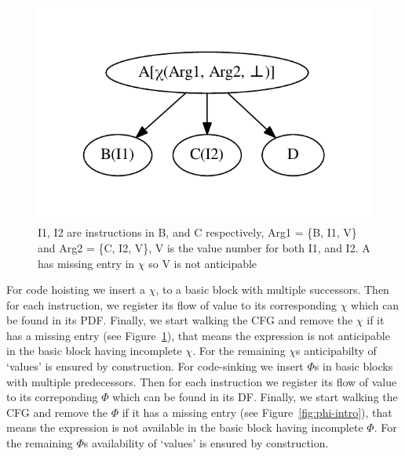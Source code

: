 \documentclass[sigplan,10pt,review,anonymous]{acmart}\settopmatter{printfolios=true,printccs=false,printacmref=false}
\begin{document}
\begin{figure}
  \includegraphics[scale=0.55]{chi-example2.pdf}
  \vspace*{-1.0cm}
\caption{I1, I2 are instructions in B, and C respectively, Arg1 = \{B, I1, V\}
  and Arg2 = \{C, I2, V\}, V is the value number for both I1, and I2. A has
  missing entry in $\chi$ so V is not anticipable}
\label{fig:chi-intro2}
\end{figure}

For code hoisting we insert a $\chi$, to a basic block with multiple
successors. Then for each instruction, we register its flow of value to its
corresponding $\chi$ which can be found in its PDF. Finally, we start walking
the CFG and remove the $\chi$ if it has a missing entry (see
Figure~\ref{fig:chi-intro2}), that means the expression is not anticipable in
the basic block having incomplete $\chi$. For the remaining $\chi$s
anticipabilty of `values' is ensured by construction. For code-sinking we insert
$\Phi$s in basic blocks with multiple predecessors. Then for each instruction we
register its flow of value to its correponding $\Phi$ which can be found in its
DF.  Finally, we start walking the CFG and remove the $\Phi$ if it has a missing
entry (see Figure~\ref{fig:phi-intro}), that means the expression is not
available in the basic block having incomplete $\Phi$. For the remaining $\Phi$s
availability of `values' is ensured by construction.
\end{document}
